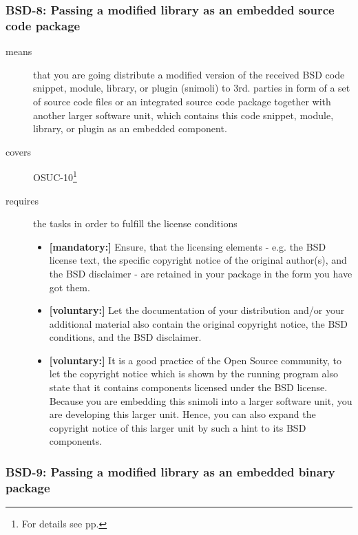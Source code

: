 \subsubsection{BSD-8: Passing a modified library as an embedded source code
package}
\label{OSUC-10-BSD}
\begin{description}
\item[means] that you are going distribute a modified version of the received
BSD code snippet, module, library, or plugin (snimoli) to 3rd. parties in form
of a set of source code files or an integrated source code package together with
another larger software unit, which contains this code snippet, module, library,
or plugin as an embedded component.
\item[covers] OSUC-10\footnote{For details see pp. \pageref{OSUC-10-DEF}}
\item[requires] the tasks in order to fulfill the license conditions
\begin{itemize}
  \item \textbf{[mandatory:]} Ensure, that the licensing elements - e.g.
  the BSD license text, the specific copyright notice of the original author(s),
  and the BSD disclaimer - are retained in your package in the form you have got
  them.
  \item \textbf{[voluntary:]} Let the documentation of your distribution
  and/or your additional material also contain the original copyright notice, the
  BSD conditions, and the BSD disclaimer.
 \item \textbf{[voluntary:]} It is a good practice of the Open Source
  community, to let the copyright notice which is shown by the running program
  also state that it contains components licensed under the BSD license. Because
  you are embedding this snimoli into a larger software unit, you are
  developing this larger unit. Hence, you can also expand the copyright notice
  of this larger unit by such a hint to its BSD components.
\end{itemize}
\end{description}


\subsubsection{BSD-9: Passing a modified library as an embedded binary
package}

